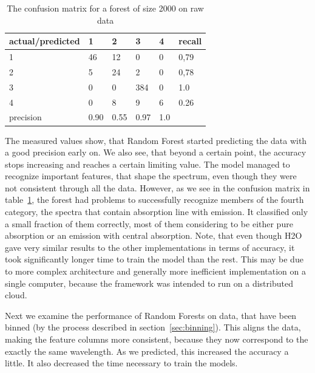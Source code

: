 \documentclass[thesis=B,english]{FITthesis}[2012/10/20]
\begin{document}
\begin{table}[h]
\begin{tabular}{|l|l|l|l|l|l|}
\hline
actual/predicted & 1 & 2 & 3 & 4 & recall \\ \hline
1 & 46 & 12 & 0 & 0 & 0,79 \\ \hline
2 & 5 & 24 & 2 & 0 & 0,78 \\ \hline
3 & 0 & 0 & 384 & 0 & 1.0 \\ \hline
4 & 0 & 8 & 9 & 6 & 0.26 \\ \hline
precision & 0.90 & 0.55 & 0.97 & 1.0 &  \\ \hline
\end{tabular}
\caption{The confusion matrix for a forest of size 2000 on raw data}
\label{tab:confrawdata}
\end{table}
The measured values show, that Random Forest started predicting the data with a good precision early on. We also see, that beyond a certain point, the accuracy stops increasing and reaches a certain limiting value. The model managed to recognize important features, that shape the spectrum, even though they were not consistent through all the data. However, as we see in the confusion matrix in table~\ref{tab:confrawdata}, the forest had problems to successfully recognize members of the fourth category, the spectra that contain absorption line with emission. It classified only a small fraction of them correctly, most of them considering to be either pure absorption or an emission with central absorption. Note, that even though H2O gave very similar results to the other implementations in terms of accuracy, it took significantly longer time to train the model than the rest. This may be due to more complex architecture and generally more inefficient implementation on a single computer, because the framework was intended to run on a distributed cloud. 

Next we examine the performance of Random Forests on data, that have been binned (by the process described in section~\ref{sec:binning}). This aligns the data, making the feature columns more consistent, because they now correspond to the exactly the same wavelength. As we predicted, this increased the accuracy a little. It also decreased the time necessary to train the models.
\end{document}
